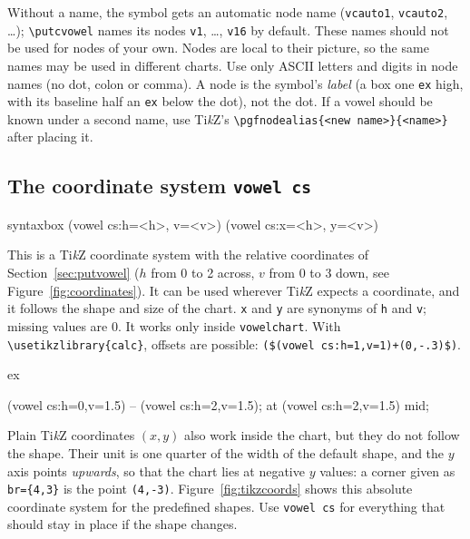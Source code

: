 \documentclass[a4paper,11pt]{article}
\newcommand\cmd[1]{\texttt{\textbackslash #1}}
\begin{document}
\noindent
Without a name, the symbol gets an automatic node name (\texttt{vcauto1},
\texttt{vcauto2}, \dots); \cmd{putcvowel} names its nodes \texttt{v1}, \dots, \texttt{v16} by default. These names should not be used for nodes of your own. Nodes are local to their picture, so the same names
may be used in different charts. Use only ASCII letters and digits in node names (no dot, colon or comma). A node is the symbol's \emph{label}
(a box one \texttt{ex} high, with its baseline half an \texttt{ex} below the dot), not the dot. If a vowel should be known under a second name, use Ti\textit{k}Z's \verb|\pgfnodealias{<new name>}{<name>}| after placing it.




\subsection{The coordinate system \texttt{vowel cs}}\label{sec:vowelcs}

\begin{tcblisting}{syntaxbox}
(vowel cs:h=<h>, v=<v>)          (vowel cs:x=<h>, y=<v>)
\end{tcblisting}

\noindent
This is a Ti\textit{k}Z coordinate system with the relative coordinates of Section~\ref{sec:putvowel} ($h$ from 0 to 2 across, $v$ from 0 to 3 down, see Figure~\ref{fig:coordinates}). It can be used wherever Ti\textit{k}Z expects a
coordinate, and it follows the shape and size of the chart. \texttt{x} and \texttt{y} are synonyms of \texttt{h} and \texttt{v};
missing values are $0$. It works only inside \texttt{vowelchart}.
With \texttt{\textbackslash usetikzlibrary\{calc\}}, offsets are possible: \verb|($(vowel cs:h=1,v=1)+(0,-.3)$)|.

\begin{tcblisting}{ex}
\begin{vowelchart}[slanted, width=4cm]
  (vowel cs:h=0,v=1.5) -- (vowel cs:h=2,v=1.5);
  \node[anchor=west, xshift=1mm]
  at (vowel cs:h=2,v=1.5) {mid};
\end{vowelchart}
\end{tcblisting}

\noindent
Plain Ti\textit{k}Z coordinates $(x,y)$ also work inside the chart, but they do not follow the shape. Their unit is one quarter of the width of the default shape, and the $y$ axis points \emph{upwards}, so that the chart lies at negative $y$ values: a corner given as \texttt{br=\{4,3\}} is the point \texttt{(4,-3)}. Figure~\ref{fig:tikzcoords} shows this absolute coordinate system for the predefined shapes. Use \texttt{vowel cs} for everything that should stay in place if the shape changes.
\end{document}
